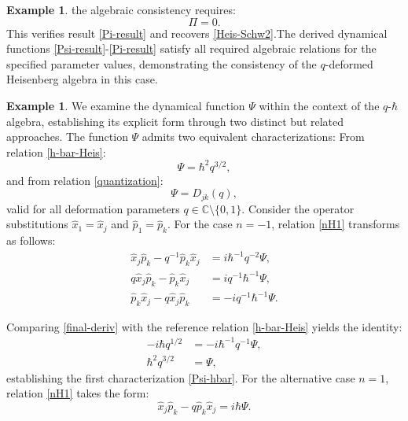 \documentclass[12pt,a4paper]{article}
\theoremstyle{plain}
\theoremstyle{definition}
\newtheorem{example}[theorem]{Example}
\theoremstyle{remark}
\begin{document}
\begin{example}
the algebraic consistency requires:
\begin{equation*}
\Pi = 0 . %
\end{equation*}
This verifies result \eqref{Pi-result} and recovers \eqref{Heis-Schw2}.The derived dynamical functions \eqref{Psi-result}-\eqref{Pi-result} satisfy all required algebraic relations for the specified parameter values, demonstrating the consistency of the $q$-deformed Heisenberg algebra in this case.
\end{example}
\begin{example}
We examine the dynamical function $\Psi$ within the context of the $q$-$\hbar$ algebra, establishing its explicit form through two distinct but related approaches. The function $\Psi$ admits two equivalent characterizations:
From relation \eqref{h-bar-Heis}:
\begin{equation}
\Psi  = \hbar^{2}q^{3/2}, \label{Psi-hbar} 
\end{equation}
and from relation \eqref{quantization}:
\begin{equation}
\Psi  = D_{jk}(q), \label{Psi-quant}
\end{equation}
valid for all deformation parameters $q \in \mathbb{C} \setminus \{0, 1\}$. Consider the operator substitutions $\hat{x}_{1} = \hat{x}_{j}$ and $\hat{p}_{1} = \hat{p}_{k}$. For the case $n = -1$, relation \eqref{nH1} transforms as follows:
\begin{align}
\hat{x}_{j}\hat{p}_{k} - q^{-1}\hat{p}_{k}\hat{x}_{j} &= i\hbar^{-1}q^{-2}\Psi, \label{start-deriv} \\
q\hat{x}_{j}\hat{p}_{k} - \hat{p}_{k}\hat{x}_{j} &= iq^{-1}\hbar^{-1}\Psi, \label{interm-deriv} \\
\hat{p}_{k}\hat{x}_{j} - q\hat{x}_{j}\hat{p}_{k} &= -iq^{-1}\hbar^{-1}\Psi. \label{final-deriv}
\end{align}

Comparing \eqref{final-deriv} with the reference relation \eqref{h-bar-Heis} yields the identity:
\begin{align}
-i\hbar q^{1/2} &= -i\hbar^{-1}q^{-1}\Psi, \label{identity} \\
\hbar^{2}q^{3/2} &= \Psi, \label{solution}
\end{align}
establishing the first characterization \eqref{Psi-hbar}. For the alternative case $n = 1$, relation \eqref{nH1} takes the form:
\begin{equation*}
\hat{x}_{j}\hat{p}_{k} - q\hat{p}_{k}\hat{x}_{j} = i\hbar\Psi. %
\end{equation*}


\end{example}
\end{document}
